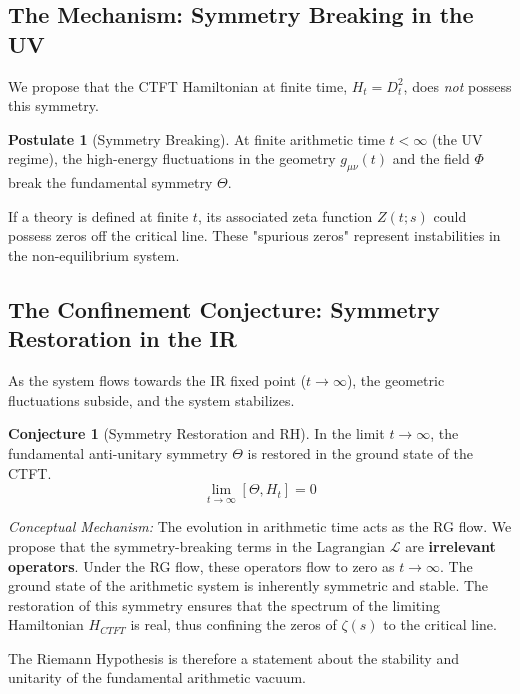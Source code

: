 \documentclass[11pt, a4paper]{article}
\theoremstyle{definition}
\newtheorem{postulate}{Postulate}
\newtheorem{conjecture}{Conjecture}[section]
\newcommand{\Lagr}{\mathcal{L}}
\begin{document}
\subsection{The Mechanism: Symmetry Breaking in the UV}
We propose that the CTFT Hamiltonian at finite time, $H_t = D_t^2$, does \textit{not} possess this symmetry.

\begin{postulate}[Symmetry Breaking]
At finite arithmetic time $t < \infty$ (the UV regime), the high-energy fluctuations in the geometry $g_{\mu\nu}(t)$ and the field $\Phi$ break the fundamental symmetry $\Theta$.
\end{postulate}

If a theory is defined at finite $t$, its associated zeta function $Z(t;s)$ could possess zeros off the critical line. These "spurious zeros" represent instabilities in the non-equilibrium system.

\subsection{The Confinement Conjecture: Symmetry Restoration in the IR}
As the system flows towards the IR fixed point ($t\to\infty$), the geometric fluctuations subside, and the system stabilizes.

\begin{conjecture}[Symmetry Restoration and RH]
In the limit $t\to\infty$, the fundamental anti-unitary symmetry $\Theta$ is restored in the ground state of the CTFT.
$$ \lim_{t\to\infty} [\Theta, H_t] = 0 $$
\end{conjecture}

\textit{Conceptual Mechanism:} The evolution in arithmetic time acts as the RG flow. We propose that the symmetry-breaking terms in the Lagrangian $\Lagr$ are \textbf{irrelevant operators}. Under the RG flow, these operators flow to zero as $t\to\infty$. The ground state of the arithmetic system is inherently symmetric and stable. The restoration of this symmetry ensures that the spectrum of the limiting Hamiltonian $H_{CTFT}$ is real, thus confining the zeros of $\zeta(s)$ to the critical line.

The Riemann Hypothesis is therefore a statement about the stability and unitarity of the fundamental arithmetic vacuum.
\end{document}
